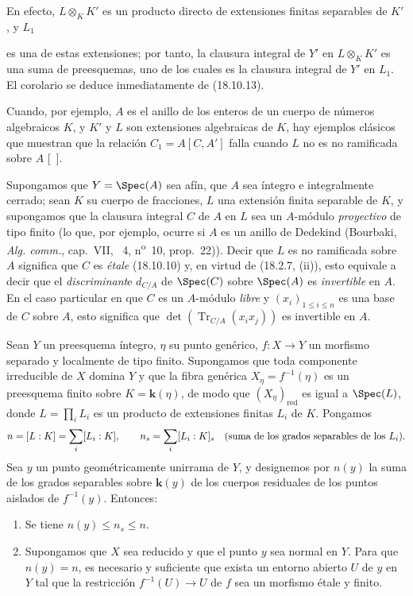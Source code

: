 En efecto, $L\otimes_K K'$ es un producto directo de extensiones finitas separables de $K'$, y $L_1$


es una de estas extensiones; por tanto, la clausura integral de $Y'$ en $L\otimes_K K'$ es una suma de preesquemas, uno de los cuales es la clausura integral de $Y'$ en $L_1$. El corolario se deduce inmediatamente de (18.10.13).

Cuando, por ejemplo, $A$ es el anillo de los enteros de un cuerpo de números algebraicos $K$, y $K'$ y $L$ son extensiones algebraicas de $K$, hay ejemplos clásicos que muestran que la relación $C_1=A[C,A']$ falla cuando $L$ no es no ramificada sobre $A$ [\ ].

\begin{env}[18.10.15]
\label{IV.18.10.15}
Supongamos que $Y=\Spec(A)$ sea afín, que $A$ sea íntegro e integralmente cerrado; sean $K$ su cuerpo de fracciones, $L$ una extensión finita separable de $K$, y supongamos que la clausura integral $C$ de $A$ en $L$ sea un $A$-módulo \emph{proyectivo} de tipo finito (lo que, por ejemplo, ocurre si $A$ es un anillo de Dedekind (Bourbaki, \emph{Alg. comm.}, cap.~VII, \textsection~4, n\textsuperscript{o}~10, prop.~22)). Decir que $L$ es no ramificada sobre $A$ significa que $C$ es \emph{étale} (18.10.10) y, en virtud de (18.2.7, (ii)), esto equivale a decir que el \emph{discriminant}e $d_{C/A}$ de $\Spec(C)$ sobre $\Spec(A)$ es \emph{invertible} en $A$. En el caso particular en que $C$ es un $A$-módulo \emph{libre} y $(x_i)_{1\leq i\leq n}$ es una base de $C$ sobre $A$, esto significa que $\det(\operatorname{Tr}_{C/A}(x_ix_j))$ es invertible en $A$.
\end{env}

\begin{theorem}[18.10.16]
\label{IV.18.10.16}
Sean $Y$ un preesquema íntegro, $\eta$ su punto genérico, $f:X\to Y$ un morfismo separado y localmente de tipo finito. Supongamos que toda componente irreducible de $X$ domina $Y$ y que la fibra genérica $X_\eta=f^{-1}(\eta)$ es un preesquema finito sobre $K=\boldsymbol k(\eta)$, de modo que $(X_\eta)_{\mathrm{red}}$ es igual a $\Spec(L)$, donde $L=\prod_iL_i$ es un producto de extensiones finitas $L_i$ de $K$. Pongamos
\[
  n=[L:K]=\sum_i[L_i:K],\qquad n_s=\sum_i[L_i:K]_s \quad\text{\textup{(suma de los grados separables de los $L_i$)}}.
\]
Sea $y$ un punto \textup{geométricamente unirrama} de $Y$, y designemos por $n(y)$ la suma de los grados separables sobre $\boldsymbol k(y)$ de los cuerpos residuales de los puntos \textup{aislados} de $f^{-1}(y)$. Entonces:
\begin{enumerate}
  \item[\textup{(i)}] Se tiene $n(y)\leq n_s\leq n$.
  \item[\textup{(ii)}] Supongamos que $X$ sea reducido y que el punto $y$ sea normal en $Y$. Para que $n(y)=n$, es necesario y suficiente que exista un entorno abierto $U$ de $y$ en $Y$ tal que la restricción $f^{-1}(U)\to U$ de $f$ sea un morfismo étale y finito.
\end{enumerate}
\end{theorem}


